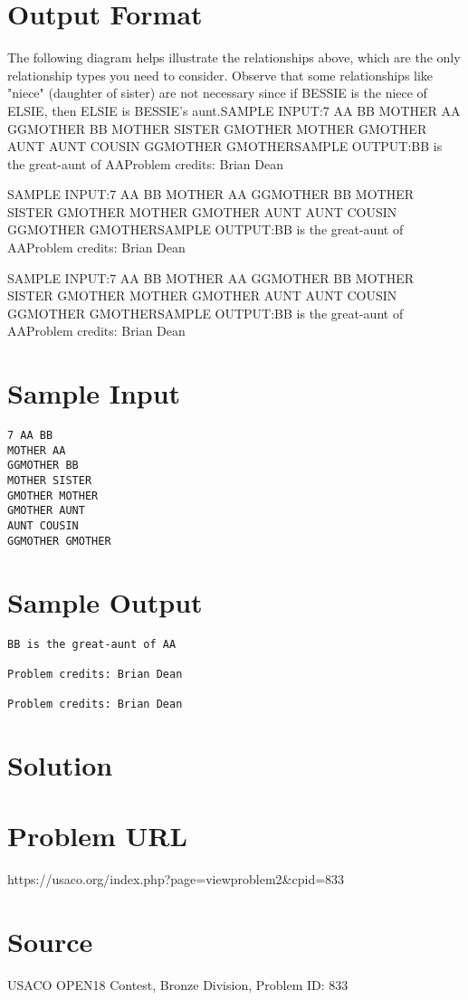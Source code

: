 \documentclass[12pt]{article}
\begin{document}
\section*{Output Format}
The following diagram helps illustrate the relationships above, which are the
only relationship types you need to consider.  Observe that 
some relationships like "niece" (daughter of sister) are not necessary since if
BESSIE is the niece of ELSIE, then ELSIE is BESSIE's aunt.SAMPLE INPUT:7 AA BB
MOTHER AA
GGMOTHER BB
MOTHER SISTER
GMOTHER MOTHER
GMOTHER AUNT
AUNT COUSIN
GGMOTHER GMOTHERSAMPLE OUTPUT:BB is the great-aunt of AAProblem credits: Brian Dean

SAMPLE INPUT:7 AA BB
MOTHER AA
GGMOTHER BB
MOTHER SISTER
GMOTHER MOTHER
GMOTHER AUNT
AUNT COUSIN
GGMOTHER GMOTHERSAMPLE OUTPUT:BB is the great-aunt of AAProblem credits: Brian Dean

SAMPLE INPUT:7 AA BB
MOTHER AA
GGMOTHER BB
MOTHER SISTER
GMOTHER MOTHER
GMOTHER AUNT
AUNT COUSIN
GGMOTHER GMOTHERSAMPLE OUTPUT:BB is the great-aunt of AAProblem credits: Brian Dean

\section*{Sample Input}
\begin{verbatim}
7 AA BB
MOTHER AA
GGMOTHER BB
MOTHER SISTER
GMOTHER MOTHER
GMOTHER AUNT
AUNT COUSIN
GGMOTHER GMOTHER
\end{verbatim}

\section*{Sample Output}
\begin{verbatim}
BB is the great-aunt of AA

Problem credits: Brian Dean

Problem credits: Brian Dean
\end{verbatim}

\section*{Solution}


\section*{Problem URL}
https://usaco.org/index.php?page=viewproblem2&cpid=833

\section*{Source}
USACO OPEN18 Contest, Bronze Division, Problem ID: 833
\end{document}
